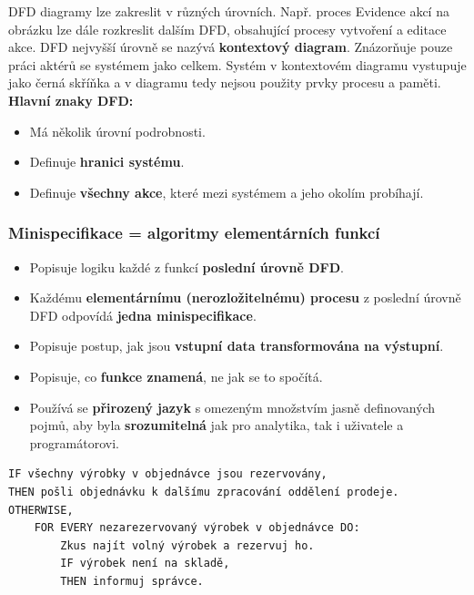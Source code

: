 DFD diagramy lze zakreslit v různých úrovních. Např. proces Evidence akcí na obrázku lze dále rozkreslit dalším DFD, obsahující procesy vytvoření a editace akce. DFD nejvyšší úrovně se nazývá \textbf{kontextový diagram}. Znázorňuje pouze práci aktérů se systémem jako celkem. Systém v kontextovém diagramu vystupuje jako černá skříňka a v diagramu tedy nejsou použity prvky procesu a paměti.
\textbf{Hlavní znaky DFD:}

\begin{itemize}
\item Má několik úrovní podrobnosti.
\item Definuje \textbf{hranici systému}.
\item Definuje \textbf{všechny akce}, které mezi systémem a jeho okolím probíhají.
\end{itemize}

\subsubsection{Minispecifikace = algoritmy elementárních funkcí}
\begin{itemize}
\item Popisuje logiku každé z funkcí \textbf{poslední úrovně DFD}.
\item Každému \textbf{elementárnímu (nerozložitelnému) procesu} z poslední úrovně DFD odpovídá \textbf{jedna minispecifikace}.
\item Popisuje postup, jak jsou \textbf{vstupní data transformována na výstupní}.
\item Popisuje, co \textbf{funkce znamená}, ne jak se to spočítá.
\item Používá se \textbf{přirozený jazyk} s omezeným množstvím jasně definovaných pojmů, aby byla \textbf{srozumitelná} jak pro analytika, tak i uživatele a programátorovi.
\end{itemize}

\smallskip
\begin{verbatim}
IF všechny výrobky v objednávce jsou rezervovány,
THEN pošli objednávku k dalšímu zpracování oddělení prodeje.
OTHERWISE,
	FOR EVERY nezarezervovaný výrobek v objednávce DO:
		Zkus najít volný výrobek a rezervuj ho.
		IF výrobek není na skladě,
		THEN informuj správce.
\end{verbatim}